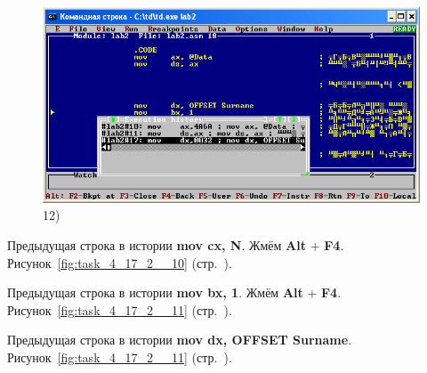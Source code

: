 \begin{figure}[!htp]
    \begin {minipage}{0.32\textwidth}
        \centering
        \includegraphics[width=.99\linewidth]
            {../_INCLUDES/task-4-17-2/12.png}
        \caption{12) }
        \label{fig:task_4_17_2__12}
    \end{minipage}
\end{figure}

Предыдущая строка в истории \textbf{mov cx, N}.
Жмём \textbf{Alt} + \textbf{F4}.
Рисунок~\ref{fig:task_4_17_2__10} (стр.~\pageref{fig:task_4_17_2__10}).

Предыдущая строка в истории \textbf{mov bx, 1}.
Жмём \textbf{Alt} + \textbf{F4}.
Рисунок~\ref{fig:task_4_17_2__11} (стр.~\pageref{fig:task_4_17_2__11}).

Предыдущая строка в истории \textbf{mov dx, OFFSET Surname}.
Рисунок~\ref{fig:task_4_17_2__11} (стр.~\pageref{fig:task_4_17_2__11}).
